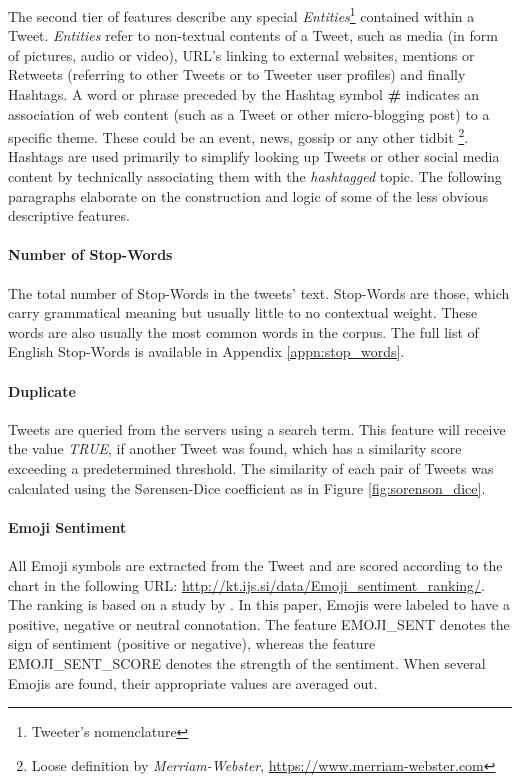 		\par
		
		The second tier of features describe any special \textit{Entities}\footnote{Tweeter's nomenclature} contained within a Tweet. \textit{Entities} refer to non-textual contents of a Tweet, such as media (in form of pictures, audio or video), URL's linking to external websites, mentions or Retweets (referring to other Tweets or to Tweeter user profiles) and finally Hashtags. A word or phrase preceded by the Hashtag symbol \textbf{\#} indicates an association of web content (such as a Tweet or other micro-blogging post) to a specific theme. These could be an event, news, gossip or any other tidbit \footnote{Loose definition by \textit{Merriam-Webster}, \url{https://www.merriam-webster.com} }. Hashtags are used primarily to simplify looking up Tweets or other social media content by technically associating them with the \textit{hashtagged} topic. The following paragraphs elaborate on the construction and logic of some of the less obvious descriptive features.
		
		\paragraph{Number of Stop-Words}
			The total number of Stop-Words in the tweets' text. Stop-Words are those, which carry grammatical meaning but usually little to no contextual weight. These words are also usually the most common words in the corpus. The full list of English Stop-Words is available in Appendix \ref{appn:stop_words}. 
	
		\paragraph{Duplicate}	
			Tweets are queried from the servers using a search term. This feature will receive the value \textit{TRUE}, if another Tweet was found, which has a similarity score exceeding a predetermined threshold. The similarity of each pair of Tweets was calculated using the S\o rensen-Dice coefficient as in Figure \ref{fig:sorenson_dice}.
		
		\paragraph{Emoji Sentiment}
			All Emoji symbols are extracted from the Tweet and are scored according to the chart in the following URL: \url{http://kt.ijs.si/data/Emoji_sentiment_ranking/}. The ranking is based on a study by \cite{Kralj2015emojis}. In this paper, Emojis were labeled to have a positive, negative or neutral connotation. The feature EMOJI\_SENT denotes the sign of sentiment (positive or negative), whereas the feature EMOJI\_SENT\_SCORE denotes the strength of the sentiment. When several Emojis are found, their appropriate values are averaged out. 
	
